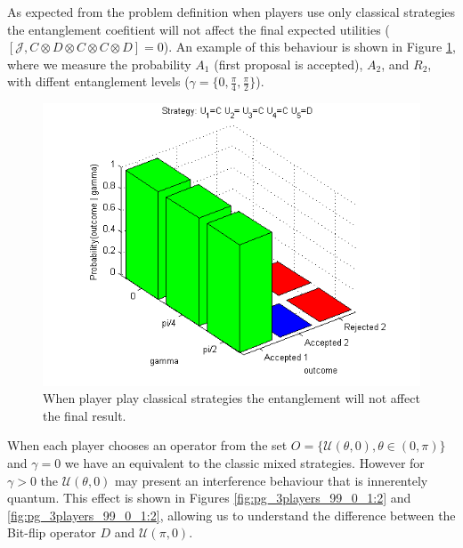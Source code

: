 As expected from the problem definition when players use only classical strategies the entanglement coefitient will not affect the final expected utilities ($[ \mathcal{J} , C \otimes D \otimes C \otimes C \otimes D ] = 0 $).
An example of this behaviour is shown in Figure \ref{fig:pg_3players_99_0_1}, where we measure the probability $A_{1}$ (first proposal is accepted), $A_{2}$, and $R_{2}$, with diffent entanglement levels ($\gamma= \{ 0 , \frac{ \pi}{4}, \frac{\pi}{2} \} $).

\begin{figure}[h]
\centering 
\includegraphics[scale=0.80]{Figures/1.5qubit/CDCCD.png}
\caption{When player play classical strategies the entanglement will not affect the final result. }
\label{fig:pg_3players_99_0_1}
\end{figure}

When each player chooses an operator from the set $O = \{ \mathcal{U} ( \theta , 0) , \theta \in (0, \pi) \}$ and $\gamma=0$ we have an equivalent to the classic mixed strategies. However for $\gamma >0$ the $\mathcal{U} ( \theta , 0)$ may present an interference behaviour that is innerentely quantum. This effect is shown in Figures \ref{fig:pg_3players_99_0_1:2} and \ref{fig:pg_3players_99_0_1:2}, allowing us to understand the difference between the Bit-flip operator $D$ and $\mathcal{U} ( \pi , 0)$.



